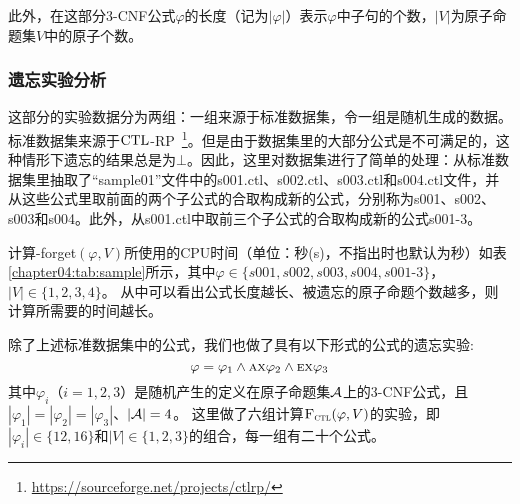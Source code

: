	此外，在这部分3-CNF公式$\varphi$的长度（记为$|\varphi|$）表示$\varphi$中子句的个数，$|V|$为原子命题集$V$中的原子个数。

\subsubsection{遗忘实验分析}
这部分的实验数据分为两组：一组来源于标准数据集，令一组是随机生成的数据。
标准数据集来源于$\textrm{CTL}$-RP~\footnote{\url{https://sourceforge.net/projects/ctlrp/}}。但是由于数据集里的大部分公式是不可满足的，这种情形下遗忘的结果总是为$\bot$。因此，这里对数据集进行了简单的处理：从标准数据集里抽取了“sample01”文件中的s001.ctl、s002.ctl、s003.ctl和s004.ctl文件，并从这些公式里取前面的两个子公式的合取构成新的公式，分别称为s001、s002、s003和s004。此外，从s001.ctl中取前三个子公式的合取构成新的公式s001-3。

计算{\CTL-forget}$(\varphi, V)$所使用的CPU时间（单位：秒(s)，不指出时也默认为秒）如表\ref{chapter04:tab:sample}所示，其中$\varphi\in \{s001,s002,s003,s004,s001$-$3\}$，$|V|\in \{1,2,3,4\}$。
从中可以看出公式长度越长、被遗忘的原子命题个数越多，则计算所需要的时间越长。

\begin{table}%
	\small
	\centering
	\caption{计算 {\CTL-forget}$(\varphi, V)$所使用的CPU时间（单位：秒(s)）}\label{chapter04:tab:sample}
\end{table}

除了上述标准数据集中的公式，我们也做了具有以下形式的公式的遗忘实验:
$$\varphi=\varphi_1 \wedge \textsc{a}\textsc{x} \varphi_2 \wedge \textsc{e}\textsc{x} \varphi_3$$
其中$\varphi_i$（$i=1,2,3$）是随机产生的定义在原子命题集${\cal A}$上的3-CNF公式，且$|\varphi_1| = |\varphi_2| =|\varphi_3|$、$|{\cal A}|=4$。
这里做了六组计算${\textsc{F}_{\textsc{ctl}}}(\varphi,V)$的实验，即$|\varphi_i| \in \{12,16\}$和$|V|\in \{1,2,3\}$的组合，每一组有二十个公式。


